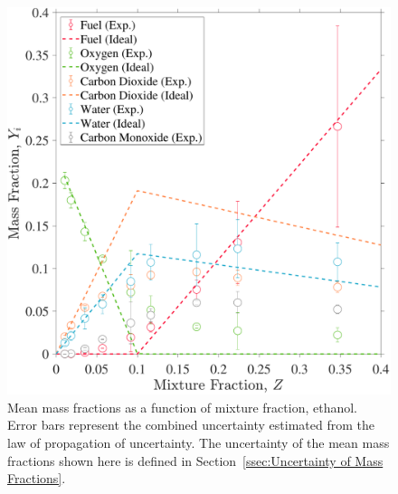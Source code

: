 \documentclass[12pt]{article}
\begin{document}
\begin{figure}[!]
	\centering
\includegraphics[width=\textwidth,keepaspectratio]{Adjusted_FuelEthanol_Mixture_Fraction_Intermediate_Plot.pdf}
	\caption[Mean mass fractions as a function of mixture fraction, ethanol]{Mean mass fractions as a function of mixture fraction, ethanol. Error bars represent the combined uncertainty estimated from the law of propagation of uncertainty. The uncertainty of the mean mass fractions shown here is defined in Section~\ref{ssec:Uncertainty of Mass Fractions}.}
	\label{fig:Ethanol_Mix_Frac}
\end{figure}
\end{document}
